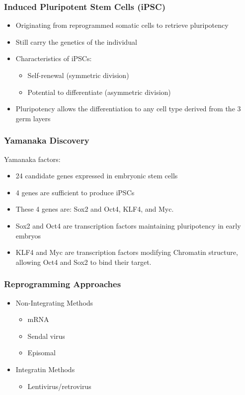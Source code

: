 \begin{itemize}
\subsubsection{Induced Pluripotent Stem Cells (iPSC)}
\begin{itemize}
    \item Originating from reprogrammed somatic cells to retrieve pluripotency 

    \item Still carry the genetics of the individual
    \item Characteristics of iPSCs:
    \begin{itemize}
        \item Self-renewal (symmetric division)
        \item Potential to differentiate (asymmetric division)
    \end{itemize}
    \item Pluripotency allows the differentiation to any  cell type derived from the 3 germ layers
\end{itemize}


\subsubsection{Yamanaka Discovery}
Yamanaka factors:
\begin{itemize}
    \item 24 candidate genes expressed in embryonic stem cells
    \item 4 genes are sufficient to produce iPSCs
    \item These 4 genes are: Sox2 and Oct4, KLF4, and Myc.
    \item Sox2 and Oct4 are transcription factors maintaining pluripotency in early embryos
    \item KLF4 and Myc are transcription factors modifying Chromatin structure, allowing Oct4 and Sox2 to bind their target.
    
\end{itemize}

\subsubsection{Reprogramming Approaches}
\begin{itemize}
    \item Non-Integrating Methods
    \begin{itemize}
        \item mRNA
        \item Sendal virus
        \item Episomal
    \end{itemize}
    \item Integratin Methods
    \begin{itemize}
        \item Lentivirus/retrovirus
    \end{itemize}
\end{itemize}


\end{itemize}
